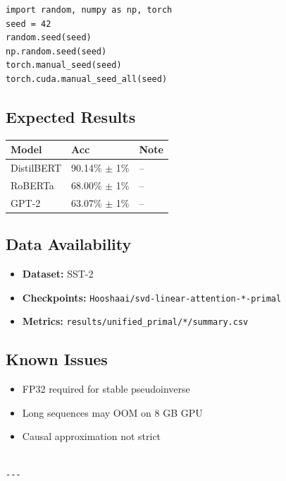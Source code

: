 \begin{lstlisting}
import random, numpy as np, torch
seed = 42
random.seed(seed)
np.random.seed(seed)
torch.manual_seed(seed)
torch.cuda.manual_seed_all(seed)
\end{lstlisting}

\subsection{Expected Results}

\begin{table}[H]
\centering
\small
\begin{tabular}{lll}
\toprule
\textbf{Model} & \textbf{Acc} & \textbf{Note} \\
\midrule
DistilBERT & 90.14\% $\pm$ 1\% & -- \\
RoBERTa & 68.00\% $\pm$ 1\% & -- \\
GPT-2 & 63.07\% $\pm$ 1\% & -- \\
\bottomrule
\end{tabular}
\end{table}

\subsection{Data Availability}

\begin{itemize}
\item \textbf{Dataset:} SST-2
\item \textbf{Checkpoints:} \texttt{Hooshaai/svd-linear-attention-*-primal}
\item \textbf{Metrics:} \texttt{results/unified\_primal/*/summary.csv}

\end{itemize}
\subsection{Known Issues}

\begin{itemize}
\item FP32 required for stable pseudoinverse
\item Long sequences may OOM on 8 GB GPU
\item Causal approximation not strict
\end{itemize}
\begin{lstlisting}

---
\end{lstlisting}



